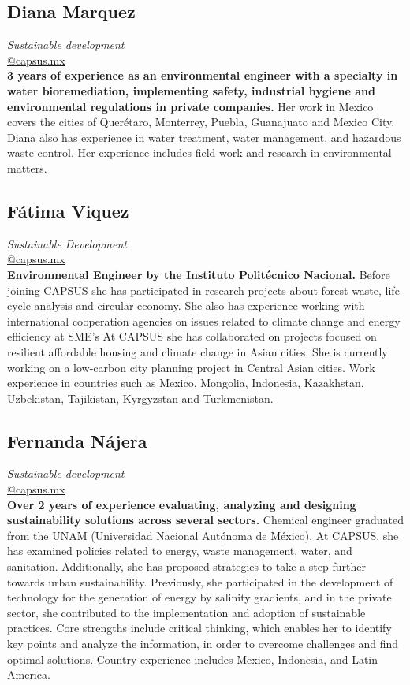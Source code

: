 \documentclass[
	a4paper,
	12pt,
	unnumberedsections,
]{CSSullivanBusinessReport}
\begin{document}
\subsection*{Diana Marquez}
\textit{Sustainable development} \\
\href{mailto:@capsus.mx}{@capsus.mx} \\[0.5em]
\textbf{3 years of experience as an environmental engineer with a specialty in water bioremediation, implementing safety, industrial hygiene and environmental regulations in private companies.} Her work in Mexico covers the cities of Querétaro, Monterrey, Puebla, Guanajuato and Mexico City. Diana also has experience in water treatment, water management, and hazardous waste control. Her experience includes field work and research in environmental matters.

\subsection*{Fátima Viquez}
\textit{Sustainable Development} \\
\href{mailto:@capsus.mx}{@capsus.mx} \\[0.5em]
\textbf{Environmental Engineer by the Instituto Politécnico Nacional.} Before joining CAPSUS she has participated in research projects about forest waste, life cycle analysis and circular economy. She also has experience working with international cooperation agencies on issues related to climate change and energy efficiency at SME’s  At CAPSUS she has collaborated on projects focused on resilient affordable housing and climate change in Asian cities. She is currently working on a low-carbon city planning project in Central Asian cities. Work experience in countries such as Mexico, Mongolia, Indonesia, Kazakhstan, Uzbekistan, Tajikistan, Kyrgyzstan and Turkmenistan.

\subsection*{Fernanda Nájera}
\textit{Sustainable development} \\
\href{mailto:@capsus.mx}{@capsus.mx} \\[0.5em]
\textbf{Over 2 years of experience evaluating, analyzing and designing sustainability solutions across several sectors.} Chemical engineer graduated from the UNAM (Universidad Nacional Autónoma de México). At CAPSUS, she has examined policies related to energy, waste management, water, and sanitation. Additionally, she has proposed strategies to take a step further towards urban sustainability. Previously, she participated in the development of technology for the generation of energy by salinity gradients, and in the private sector, she contributed to the implementation and adoption of sustainable practices. Core strengths include critical thinking, which enables her to identify key points and analyze the information, in order to overcome challenges and find optimal solutions. Country experience includes Mexico, Indonesia, and Latin America.
\end{document}
